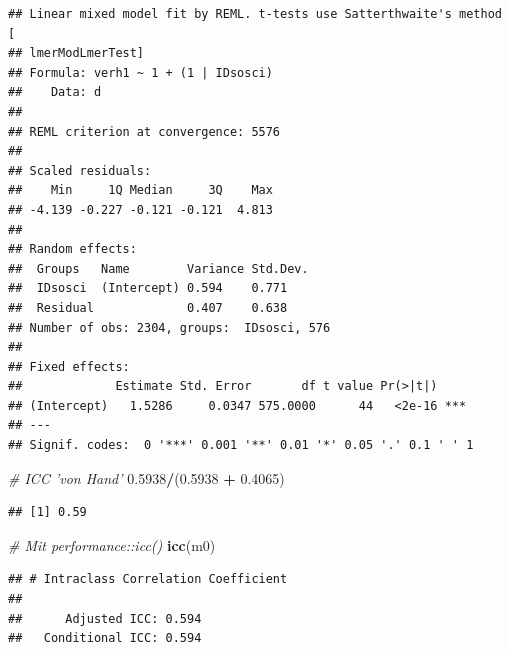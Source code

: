 \documentclass[
]{book}
\newenvironment{Shaded}{\begin{snugshade}}{\end{snugshade}}
\newcommand{\CommentTok}[1]{\textcolor[rgb]{0.56,0.35,0.01}{\textit{#1}}}
\newcommand{\FloatTok}[1]{\textcolor[rgb]{0.00,0.00,0.81}{#1}}
\newcommand{\KeywordTok}[1]{\textcolor[rgb]{0.13,0.29,0.53}{\textbf{#1}}}
\newcommand{\NormalTok}[1]{#1}
\newcommand{\OperatorTok}[1]{\textcolor[rgb]{0.81,0.36,0.00}{\textbf{#1}}}
\newcommand{\StringTok}[1]{\textcolor[rgb]{0.31,0.60,0.02}{#1}}
\begin{document}
\begin{verbatim}
## Linear mixed model fit by REML. t-tests use Satterthwaite's method [
## lmerModLmerTest]
## Formula: verh1 ~ 1 + (1 | IDsosci)
##    Data: d
## 
## REML criterion at convergence: 5576
## 
## Scaled residuals: 
##    Min     1Q Median     3Q    Max 
## -4.139 -0.227 -0.121 -0.121  4.813 
## 
## Random effects:
##  Groups   Name        Variance Std.Dev.
##  IDsosci  (Intercept) 0.594    0.771   
##  Residual             0.407    0.638   
## Number of obs: 2304, groups:  IDsosci, 576
## 
## Fixed effects:
##             Estimate Std. Error       df t value Pr(>|t|)    
## (Intercept)   1.5286     0.0347 575.0000      44   <2e-16 ***
## ---
## Signif. codes:  0 '***' 0.001 '**' 0.01 '*' 0.05 '.' 0.1 ' ' 1
\end{verbatim}

\begin{Shaded}
\begin{Highlighting}[]
\CommentTok{# ICC 'von Hand'}
\FloatTok{0.5938}\OperatorTok{/}\NormalTok{(}\FloatTok{0.5938} \OperatorTok{+}\StringTok{ }\FloatTok{0.4065}\NormalTok{)}
\end{Highlighting}
\end{Shaded}

\begin{verbatim}
## [1] 0.59
\end{verbatim}

\begin{Shaded}
\begin{Highlighting}[]
\CommentTok{# Mit performance::icc()}
\KeywordTok{icc}\NormalTok{(m0)}
\end{Highlighting}
\end{Shaded}

\begin{verbatim}
## # Intraclass Correlation Coefficient
## 
##      Adjusted ICC: 0.594
##   Conditional ICC: 0.594
\end{verbatim}
\end{document}
